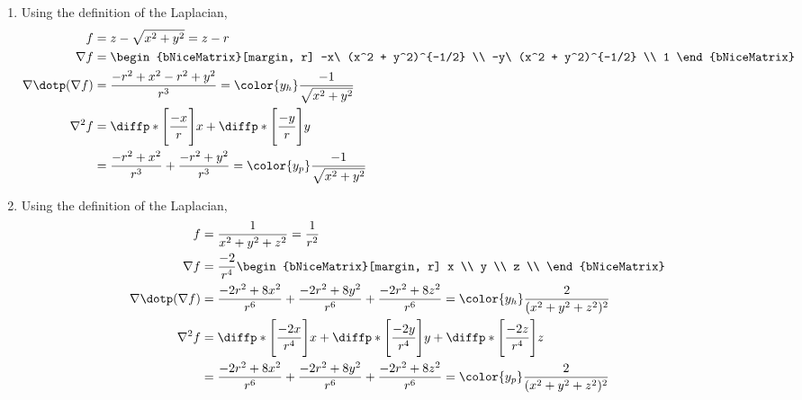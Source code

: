 \begin{enumerate}
    \item Using the definition of the Laplacian,
          \begin{align}
              f                       & = z - \sqrt{x^2 + y^2} = z - r      \\
              \nabla f                & = \begin{bNiceMatrix}[margin, r]
                                              -x\ (x^2 + y^2)^{-1/2} \\
                                              -y\ (x^2 + y^2)^{-1/2} \\
                                              1
                                          \end{bNiceMatrix}     \\
              \nabla \dotp (\nabla f) & = \frac{-r^2 + x^2- r^2 + y^2}{r^3}
              = \color{y_h} \frac{-1}{\sqrt{x^2 + y^2}}                     \\
              \nabla^2 f              & =
              \diffp*{\Bigg[ \frac{-x}{r} \Bigg]}{x}
              + \diffp*{\Bigg[ \frac{-y}{r} \Bigg]}{y}                      \\
                                      & = \frac{-r^2 + x^2}{r^3}
              + \frac{-r^2 + y^2}{r^3} = \color{y_p} \frac{-1}{\sqrt{x^2 + y^2}}
          \end{align}

    \item Using the definition of the Laplacian,
          \begin{align}
              f                       & = \frac{1}{x^2 + y^2 + z^2} = \frac{1}{r^2}   \\
              \nabla f                & = \frac{-2}{r^4}\begin{bNiceMatrix}[margin, r]
                                                            x \\
                                                            y \\
                                                            z \\
                                                        \end{bNiceMatrix} \\
              \nabla \dotp (\nabla f) & = \frac{-2r^2 + 8x^2}{r^6}
              + \frac{-2r^2 + 8y^2}{r^6} + \frac{-2r^2 + 8z^2}{r^6}
              = \color{y_h} \frac{2}{(x^2 + y^2 + z^2)^2}                             \\
              \nabla^2 f              & =
              \diffp*{\Bigg[ \frac{-2x}{r^4} \Bigg]}{x}
              + \diffp*{\Bigg[ \frac{-2y}{r^4} \Bigg]}{y}
              + \diffp*{\Bigg[ \frac{-2z}{r^4} \Bigg]}{z}                             \\
                                      & = \frac{-2r^2 + 8x^2}{r^6}
              + \frac{-2r^2 + 8y^2}{r^6} + \frac{-2r^2 + 8z^2}{r^6}
              = \color{y_p} \frac{2}{(x^2 + y^2 + z^2)^2}
          \end{align}


\end{enumerate}
